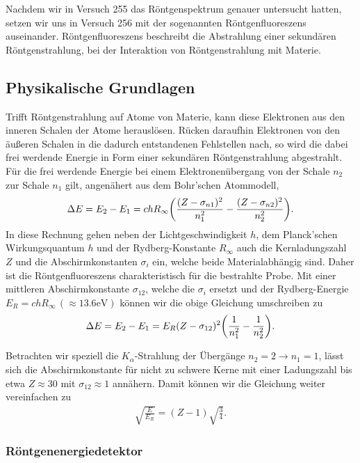 Nachdem wir in Versuch 255 das Röntgenspektrum genauer untersucht hatten, setzen wir uns in Versuch 256 mit der sogenannten Röntgenfluoreszens auseinander. Röntgenfluoreszens beschreibt die Abstrahlung einer sekundären Röntgenstrahlung, bei der Interaktion von Röntgenstrahlung mit Materie.


\subsection{Physikalische Grundlagen}

Trifft Röntgenstrahlung auf Atome von Materie, kann diese Elektronen aus den inneren Schalen der Atome herauslösen. Rücken daraufhin Elektronen von den äußeren Schalen in die dadurch entstandenen Fehlstellen nach, so wird die dabei frei werdende Energie in Form einer sekundären Röntgenstrahlung abgestrahlt. Für die frei werdende Energie bei einem Elektronenübergang von der Schale $n_2$ zur Schale $n_1$ gilt, angenähert aus dem Bohr'schen Atommodell,
\begin{align}
  \Delta E = E_{2} - E_{1} = ch R_{\infty} \qty(\frac{(Z- \sigma_{n1})^2}{n_1^2} - \frac{(Z- \sigma_{n2})^2}{n_2^2}).
\end{align}
In diese Rechnung gehen neben der Lichtgeschwindigkeit $h$, dem Planck'schen Wirkungsquantum $h$ und der Rydberg-Konstante $R_{\infty}$ auch die Kernladungszahl $Z$ und die Abschirmkonstanten $\sigma_i$ ein, welche beide Materialabhängig sind. Daher ist die Röntgenfluoreszens charakteristisch für die bestrahlte Probe. Mit einer mittleren Abschirmkonstante $\sigma_{12}$, welche die $\sigma_{i}$ ersetzt und der Rydberg-Energie $E_{R} = ch R_{\infty}\, (\approx 13.6\si{\electronvolt})$ können wir die obige Gleichung umschreiben zu
\begin{align}
  \Delta E = E_2 - E_1 = E_{R} (Z - \sigma_{12})^2 \qty(\frac{1}{n_1^2} - \frac{1}{n_2^2}).
\end{align}

Betrachten wir speziell die $K_{\alpha}$-Strahlung der Übergänge $n_{2} = 2\to n_{1} = 1$, lässt sich die Abschirmkonstante für nicht zu schwere Kerne mit einer Ladungszahl bis etwa $Z \approx 30$ mit $\sigma_{12} \approx 1$ annähern. Damit können wir die Gleichung weiter vereinfachen zu
\begin{align}
  \sqrt{\frac{E}{E_R}} = (Z - 1) \sqrt{\frac{3}{4}}.
\end{align}

\subsubsection*{Röntgenenergiedetektor}

